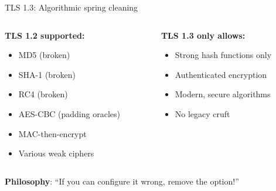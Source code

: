 \documentclass[aspectratio=169, lualatex, handout]{beamer}
\begin{document}
\begin{frame}{TLS 1.3: Algorithmic spring cleaning}
	\begin{columns}[c]
		\begin{column}{0.5\textwidth}
			\textbf{TLS 1.2 supported:}
			\begin{itemize}
				\item MD5 (broken)
				\item SHA-1 (broken)
				\item RC4 (broken)
				\item AES-CBC (padding oracles)
				\item MAC-then-encrypt
				\item Various weak ciphers
			\end{itemize}
		\end{column}
		\begin{column}{0.5\textwidth}
			\textbf{TLS 1.3 only allows:}
			\begin{itemize}
				\item Strong hash functions only
				\item Authenticated encryption
				\item Modern, secure algorithms
				\item No legacy cruft
			\end{itemize}
		\end{column}
	\end{columns}
	\pause
	\begin{center}
		\textbf{Philosophy}: ``If you can configure it wrong, remove the option!''
	\end{center}
\end{frame}
\end{document}
